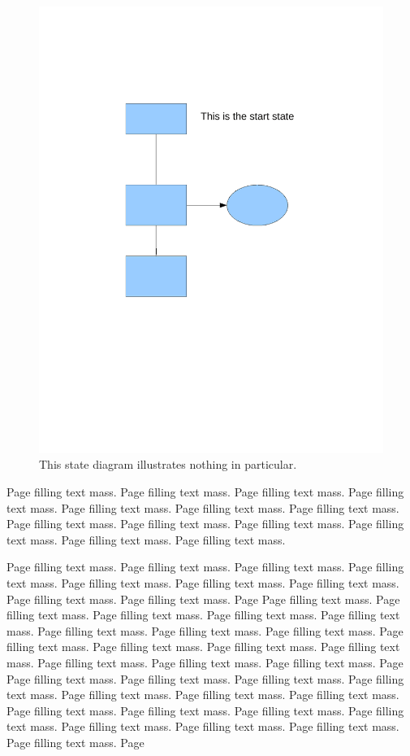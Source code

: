 \documentclass[12pt,a4paper,twoside,openright]{book}
\begin{document}
\begin{figure}[h!]
	\centering
  	\centerline{\includegraphics[width=1\textwidth, clip=true, scale=0.5, trim=3cm 9cm 3cm 5cm ]{Random_figure.pdf}}
  	\caption[State diagram from a PDF file.]{This state diagram illustrates nothing in particular.}
  	\label{fig:pdfexample}
\end{figure}


Page filling text mass. Page filling text mass. Page filling text mass. Page
filling text mass. Page filling text mass. Page filling text mass. Page
filling text mass. Page filling text mass. Page filling text mass. Page
filling text mass. Page filling text mass. Page filling text mass. Page
filling text mass.

Page filling text mass. Page filling text mass. Page filling text mass. Page
filling text mass. Page filling text mass. Page filling text mass. Page
filling text mass. Page filling text mass. Page filling text mass. Page
Page filling text mass. Page filling text mass. Page filling text mass. Page
filling text mass. Page filling text mass. Page filling text mass. Page
filling text mass. Page filling text mass. Page filling text mass. Page
filling text mass. Page filling text mass. Page filling text mass. Page
filling text mass. Page filling text mass. Page filling text mass. Page
Page filling text mass. Page filling text mass. Page filling text mass. Page
filling text mass. Page filling text mass. Page filling text mass. Page
filling text mass. Page filling text mass. Page filling text mass. Page
filling text mass. Page filling text mass. Page filling text mass. Page
filling text mass. Page filling text mass. Page filling text mass. Page
\end{document}
